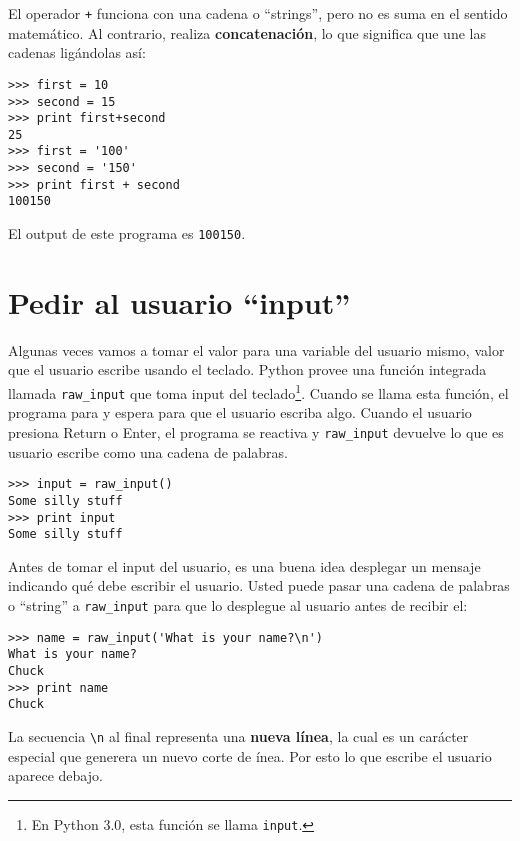 \begin{ex}
El operador {\tt +} funciona con una cadena o ``strings'', pero no es suma en el sentido matem\'atico. Al contrario, realiza 
{\bf concatenaci\'on}, lo que significa que une las cadenas lig\'andolas as\'i:
















\beforeverb
\begin{verbatim}
>>> first = 10
>>> second = 15
>>> print first+second
25
>>> first = '100'
>>> second = '150'
>>> print first + second
100150
\end{verbatim}
\afterverb
%

El output de este programa es {\tt 100150}.

\section{Pedir al usuario ``input''}


Algunas veces vamos a tomar el valor para una variable del usuario mismo, valor que el usuario escribe usando el teclado.
Python provee una funci\'on integrada llamada \verb"raw_input" que toma input del teclado\footnote{En Python 3.0, esta funci\'on se llama 
  {\tt input}.}.  Cuando se llama esta funci\'on, el programa para y espera
para que el usuario escriba algo. Cuando el usuario presiona {\sf
  Return} o {\sf Enter}, el programa se reactiva y \verb"raw_input"
devuelve lo que es usuario escribe como una cadena de palabras.


\beforeverb
\begin{verbatim}
>>> input = raw_input()
Some silly stuff
>>> print input
Some silly stuff
\end{verbatim}
\afterverb
%
Antes de tomar el input del usuario, es una buena idea desplegar un mensaje indicando qu\'e debe escribir el usuario. Usted puede pasar una cadena de palabras o ``string'' a \verb"raw_input" para que lo desplegue al usuario antes de recibir el:


\beforeverb
\begin{verbatim}
>>> name = raw_input('What is your name?\n')
What is your name?
Chuck
>>> print name
Chuck
\end{verbatim}
\afterverb
%
La secuencia \verb"\n" al final representa una {\bf nueva l\'inea},
la cual es un car\'acter especial que generera un nuevo corte de \'inea. Por esto lo que escribe el usuario aparece debajo.


\end{ex}

